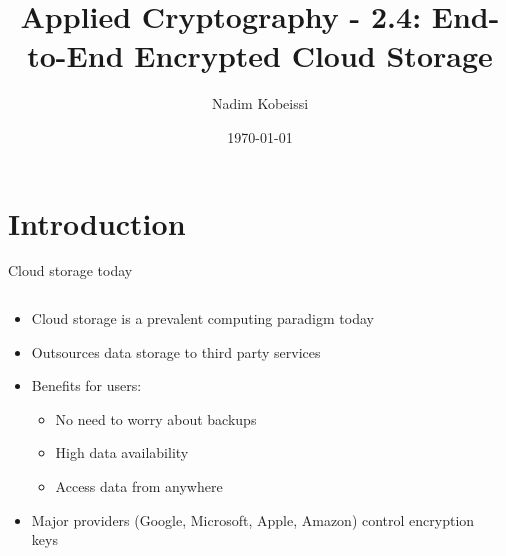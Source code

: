 \documentclass[aspectratio=169, lualatex, handout]{beamer}
\title{Applied Cryptography - 2.4: End-to-End Encrypted Cloud Storage}
\author{Nadim Kobeissi}
\institute{American University of Beirut}
\date{\today}
\begin{document}
\begin{frame}[plain]
	\titlepage
\end{frame}

\section{Introduction}

\begin{frame}{Cloud storage today}
	\begin{columns}[c]
		\begin{column}{0.5\textwidth}
			\begin{itemize}
				\item Cloud storage is a prevalent computing paradigm today
				\item Outsources data storage to third party services
				\item Benefits for users:
				      \begin{itemize}
					      \item No need to worry about backups
					      \item High data availability
					      \item Access data from anywhere
				      \end{itemize}
				\item Major providers (Google, Microsoft, Apple, Amazon) control encryption keys
			\end{itemize}
		\end{column}
		\begin{column}{0.5\textwidth}
		\end{column}
	\end{columns}
\end{frame}
\end{document}
